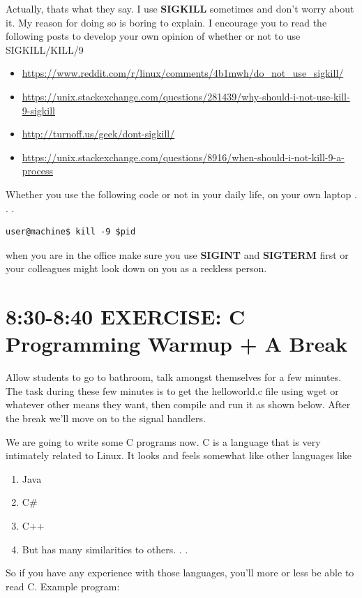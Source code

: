 \documentclass[8pt]{article}
\begin{document}
Actually, thats what they say. I use \textbf{SIGKILL} sometimes and don't worry about it. My reason for doing so is boring to explain. I encourage you to read the following posts to develop your own opinion of whether or not to use SIGKILL/KILL/9

\begin{itemize}
\item \url{https://www.reddit.com/r/linux/comments/4b1mwh/do_not_use_sigkill/}
\item \url{https://unix.stackexchange.com/questions/281439/why-should-i-not-use-kill-9-sigkill}
\item \url{http://turnoff.us/geek/dont-sigkill/}
\item \url{https://unix.stackexchange.com/questions/8916/when-should-i-not-kill-9-a-process}
\end{itemize}

Whether you use the following code or not in your daily life, on your own laptop . . .

\begin{lstlisting}
user@machine$ kill -9 $pid
\end{lstlisting}

when you are in the office make sure you use \textbf{SIGINT} and \textbf{SIGTERM} first or your colleagues might look down on you as a reckless person.

\section{{\color{red} 8:30-8:40 EXERCISE: C Programming Warmup + A Break}}
{\color{green} Allow students to go to bathroom, talk amongst themselves for a
few minutes. The task during these few minutes is to get the helloworld.c file
using wget or whatever other means they want, then compile and run it as shown
below. After the break we'll move on to the signal handlers}.

We are going to write some C programs now. C is a language that is very intimately related to Linux. It looks and feels somewhat like other languages like 
\begin{enumerate}
\item Java
\item C\#
\item C++
\item But has many similarities to others. . .
\end{enumerate}

So if you have any experience with those languages, you'll more or less be able to read C.
Example program:
\end{document}

